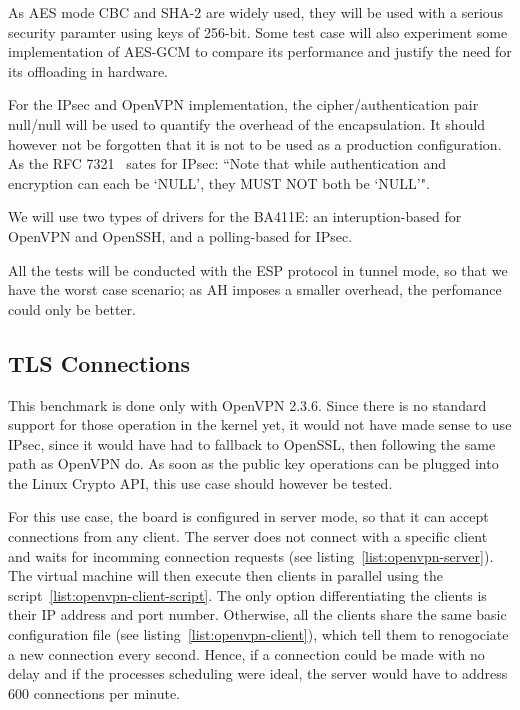 \noindent As AES mode CBC and SHA-2 are widely used, they will be used with a serious security paramter using keys of 256-bit.
Some test case will also experiment some implementation of AES-GCM to compare its performance and justify the need for its offloading in hardware.

For the IPsec and OpenVPN implementation, the cipher/authentication pair null/null will be used to quantify the overhead of the encapsulation.
It should however not be forgotten that it is not to be used as a production configuration.
As the RFC 7321~\citep[pg. 7]{rfc7321} sates for IPsec: ``Note that while authentication and encryption can each
   be `NULL', they MUST NOT both be `NULL'".

We will use two types of drivers for the BA411E: an interuption-based for OpenVPN and OpenSSH, and a polling-based for IPsec.

All the tests will be conducted with the ESP protocol in tunnel mode, so that we have the worst case scenario; as AH imposes a smaller overhead, the perfomance could only be better.

\subsection{TLS Connections}
This benchmark is done only with OpenVPN 2.3.6.
Since there is no standard support for those operation in the kernel yet, it would not have made sense to use IPsec, since it would have had to fallback to OpenSSL, then following the same path as OpenVPN do.
As soon as the public key operations can be plugged into the Linux Crypto API, this use case should however be tested.

For this use case, the board is configured in server mode, so that it can accept connections from any client.
The server does not connect with a specific client and waits for incomming connection requests (see listing~\ref{list:openvpn-server}).
The virtual machine will then execute then clients in parallel using the script~\ref{list:openvpn-client-script}.
The only option differentiating the clients is their IP address and port number.
Otherwise, all the clients share the same basic configuration file (see listing~\ref{list:openvpn-client}), which tell them to renogociate a new connection every second.
Hence, if a connection could be made with no delay and if the processes scheduling were ideal, the server would have to address 600 connections per minute.




